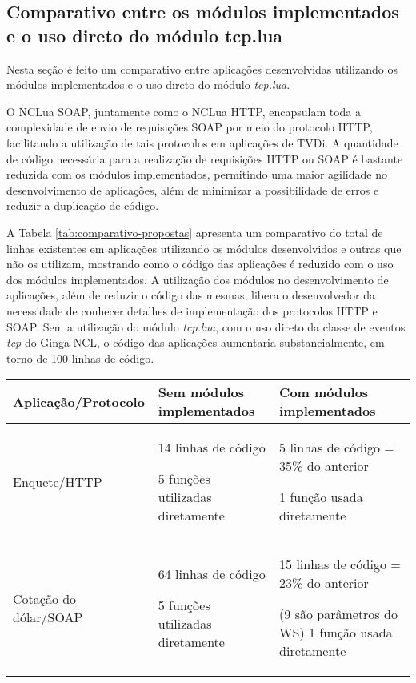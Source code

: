 \subsection{Comparativo entre os módulos implementados e o uso direto do módulo tcp.lua}

Nesta seção é feito um comparativo entre aplicações desenvolvidas
utilizando os módulos implementados e o uso direto do módulo \textit{tcp.lua}\cite{doc-nclua}.

O NCLua SOAP, juntamente como o NCLua HTTP, encapsulam toda a complexidade
de envio de requisições SOAP por meio do protocolo HTTP, facilitando
a utilização de tais protocolos em aplicações de TVDi.
A quantidade de código necessária para a realização de requisições HTTP ou SOAP
é bastante reduzida com os módulos implementados, permitindo
uma maior agilidade no desenvolvimento de aplicações, além
de minimizar a possibilidade de erros e reduzir a duplicação
de código.

A Tabela \ref{tab:comparativo-propostas} apresenta um comparativo do total de linhas existentes 
em aplicações utilizando os módulos desenvolvidos e outras que não os utilizam, mostrando
como o código das aplicações é reduzido com o uso dos módulos implementados.
A utilização dos módulos no desenvolvimento de aplicações, além
de reduzir o código das mesmas, libera o desenvolvedor da necessidade
de conhecer detalhes de implementação dos protocolos HTTP e SOAP.
Sem a utilização do módulo \textit{tcp.lua}, com o uso direto da classe de eventos
\textit{tcp} do Ginga-NCL, o código das aplicações aumentaria substancialmente, em torno de 100 linhas
de código.

\begin{center}
\scriptsize{
	\begin{tabular}{|p{3cm}|p{4cm}|p{6cm}|} %
  \hline
		\textbf{Aplicação/Protocolo} & \textbf{Sem módulos implementados} & \textbf{Com módulos implementados} \\
  \hline
		Enquete/HTTP & 14 linhas de código\par5 funções utilizadas diretamente & 
    5 linhas de código = 35\% do anterior\par1 função usada diretamente \\
  \hline
		Cotação do dólar/SOAP & 64 linhas de código\par5 funções utilizadas diretamente & 
    15 linhas de código = 23\% do anterior
    \par(9 são parâmetros do WS) 1 função usada diretamente \\
  \hline
	\end{tabular}
	\label{tab:comparativo-propostas}
}
\end{center}

